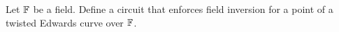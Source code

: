 \begin{comment}
\begin{example}[Baby-JubJub]
Considering our pen-and-paper Baby JubJub curve over from XXX\sme{add reference}. We recall from XXX\sme{add reference} that $(11,9)$ is a generator for the large prime order subgroup. We therefor already know from XXX\sme{add reference} that
$(11,9) + (7,8) = (11,9) + [3](11,9) = [4](11,9) = (2,9)$. So we execute the circuit  and get
\begin{align*}
x_1 = 11 & = S_1\\
x_2 = 7 & = S_2\\
y_1 = 9 & = S_3 \\
y_2 = 8 & = S_4 \\
1+ 8\cdot S_1\cdot S_2 \cd = 9 & = S_5 \\
y_3 = 8 & = S_6 \\
11 \cdot 8 = 10 & = S_7 \\
11 \cdot 7 =  12 & = S_8 \\
7 \cdot 9 =  11 & = S_9 \\
9 \cdot 8 = 7 & = S_{10} \\
12 \cdot 7 = 6 & = S_{11} \\
S_5 \cdot (1+ d\cdot S_{11}) & = 1 \\
S_6 \cdot (1 - d\cdot S_{11}) & = 1 \\
S_5 \cdot (S_9 + S_7) & = S_{14} \\
S_6 \cdot (S_{10} - a\cdot S_8) & = S_{15}
\end{align*}
\end{example}
\end{comment}
\begin{exercise}
Let $\mathbb{F}$ be a field. Define a circuit that enforces field inversion for a point of a twisted Edwards curve over $\mathbb{F}$.
\end{exercise}
